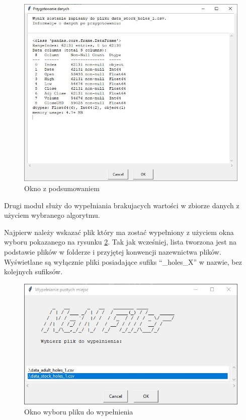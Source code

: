 \documentclass[12pt,twoside]{article}
\begin{document}
\begin{figure}[ht]
    \centering
    \includegraphics[width=12cm]{img/04.jpg}
    \caption{Okno z podsumowaniem}
    \label{Fig:gen_end}
\end{figure}
\FloatBarrier


Drugi moduł służy do wypełniania brakujacych wartości w zbiorze danych z użyciem wybranego algorytmu.

Najpierw należy wskazać plik który ma zostać wypełniony z użyciem okna wyboru pokazanego na rysunku \ref{Fig:fill_file}.
Tak jak wcześniej, lista tworzona jest na podstawie plików w folderze i przyjętej konwencji nazewnictwa plików.
Wyświetlane są wyłącznie pliki posiadające sufiks ``\_holes\_X'' w nazwie, bez kolejnych sufiksów.

\begin{figure}[ht]
    \centering
    \includegraphics[width=12cm]{img/05.jpg}
    \caption{Okno wyboru pliku do wypełnienia}
    \label{Fig:fill_file}
\end{figure}
\FloatBarrier
\end{document}
